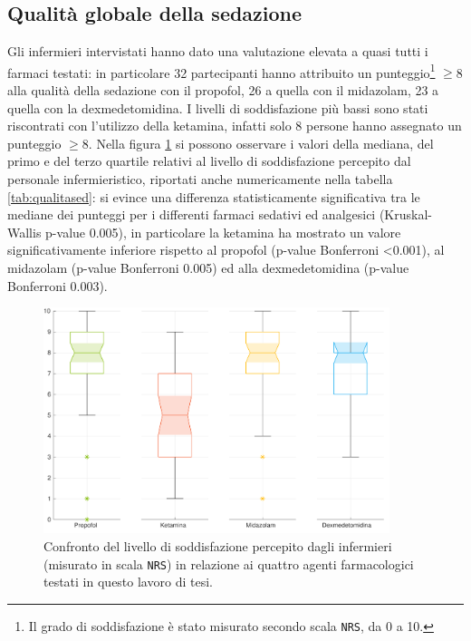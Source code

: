 \subsection*{Qualità globale della sedazione}
Gli infermieri intervistati hanno dato una valutazione elevata a quasi tutti i farmaci testati: in particolare 32 partecipanti hanno attribuito un punteggio\footnote{Il grado di soddisfazione è stato misurato secondo scala \texttt{NRS}, da 0 a 10.} $\geq$8 alla qualità della sedazione con il propofol, 26 a quella con il midazolam, 23 a quella con la dexmedetomidina. I livelli di soddisfazione più bassi sono stati riscontrati con l'utilizzo della ketamina, infatti solo 8 persone hanno assegnato un punteggio $\geq$8. Nella figura \ref{fig:qualitascolorful} si possono osservare i valori della mediana, del primo e del terzo quartile relativi al livello di soddisfazione percepito dal personale infermieristico, riportati anche numericamente nella tabella \ref{tab:qualitased}: si evince una differenza statisticamente significativa tra le mediane dei punteggi per i differenti farmaci sedativi ed analgesici (Kruskal-Wallis p-value 0.005), in particolare la ketamina ha mostrato un valore significativamente inferiore rispetto al propofol (p-value Bonferroni <0.001), al midazolam (p-value Bonferroni 0.005) ed alla dexmedetomidina (p-value Bonferroni 0.003).

\begin{figure}[h]
    \centering
    \includegraphics[width=0.9\textwidth]{Figure/qualita-colorful.pdf}
    \caption{Confronto del livello di soddisfazione percepito dagli infermieri (misurato in scala \texttt{NRS}) in relazione ai quattro agenti farmacologici testati in questo lavoro di tesi.}
    \label{fig:qualitascolorful}
\end{figure}

